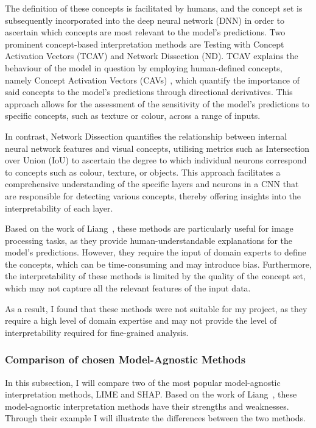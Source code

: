 The definition of these concepts is facilitated by humans, and the concept set is subsequently incorporated into the deep neural
network (DNN) in order to ascertain which concepts are most relevant to the model's predictions.
Two prominent concept-based interpretation methods are Testing with Concept Activation Vectors (TCAV) and Network Dissection (ND).
TCAV explains the behaviour of the model in question by employing human-defined concepts, namely Concept Activation Vectors (CAVs)
, which quantify the importance of said concepts to the model's predictions through directional derivatives.
This approach allows for the assessment of the sensitivity of the model's predictions to specific concepts,
such as texture or colour, across a range of inputs.

In contrast, Network Dissection quantifies the relationship between internal neural network features and visual concepts,
utilising metrics such as Intersection over Union (IoU) to ascertain the degree to which individual neurons correspond to
concepts such as colour, texture, or objects. This approach facilitates a comprehensive understanding of the specific layers
and neurons in a CNN that are responsible for detecting various concepts, thereby offering insights into the interpretability of each layer.

Based on the work of Liang~\cite{LIANG2021168}, these methods are particularly useful for image processing tasks,
as they provide human-understandable explanations for the model's predictions.
However, they require the input of domain experts to define the concepts, which can be time-consuming and may introduce bias.
Furthermore, the interpretability of these methods is limited by the quality of the concept set, which may not capture all
the relevant features of the input data.

As a result, I found that these methods were not suitable for my project, as they
require a high level of domain expertise and may not provide the level of interpretability required for fine-grained analysis.





\subsubsection{Comparison of chosen Model-Agnostic Methods}\label{subsubsec:comparison-of-model-agnostic-methods}

In this subsection, I will compare two of the most popular model-agnostic interpretation methods, LIME and SHAP.
Based on the work of Liang~\cite{LIANG2021168}, these model-agnostic interpretation methods have their strengths and weaknesses.
Through their example I will illustrate the differences between the two methods.

